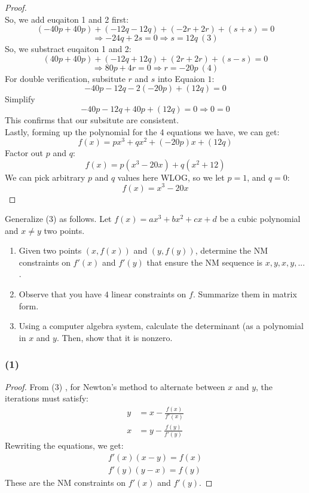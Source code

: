 \documentclass{article}
\begin{document}
\begin{proof}
    \\
    So, we add euqaiton 1 and 2 first:
    \[ (-40p + 40p) + (-12q - 12q) + (-2r + 2r) + (s + s) = 0 \]
    \[ \Rightarrow -24q + 2s = 0 \Longrightarrow s = 12q \ (3) \]
    So, we substract euqaiton 1 and 2:\
    \[ (40p + 40p) + (-12q + 12q) + (2r + 2r) + (s - s) = 0 \]
    \[ \Rightarrow 80p + 4r = 0 \Longrightarrow r = -20p \ (4) \]
    For double verification, subsitute $r$ and $s$ into Equaion $1$:
    \[ -40p - 12q - 2(-20p) + (12q) = 0 \]
    Simplify
    \[ -40p - 12q + 40p + (12q) = 0 \Longrightarrow 0 = 0 \]
    This confirms that our subsitute are consistent.
    \\
    Lastly, forming up the polynomial for the 4 equations we have, we can get:
    \[ f(x) = px^3 + qx^2 + (-20p)x + (12q) \]
    Factor out $p$ and $q$:
    \[ f(x) = p(x^3 - 20x) + q(x^2 + 12) \]
    We can pick arbitrary $p$ and $q$ values here WLOG, so we let $p = 1$, and $q = 0$:
    \[ f(x) = x^3 - 20x \]
\end{proof}

\begin{problem}
    Generalize (3) as follows. Let \(f(x) = ax^3 + bx^2 + cx +d\) be a cubic polynomial and \(x\neq y\) two points.
    \begin{enumerate}
        \item Given two points \((x,f(x))\) and \((y,f(y))\), determine the NM constraints on \(f'(x)\) and \(f'(y)\) that ensure the NM sequence is \(x,y,x,y,...\).
        \item Observe that you have \(4\) linear constraints on \(f\). Summarize them in matrix form.
        \item Using a computer algebra system, calculate the determinant (as a polynomial in \(x\) and \(y\). Then, show that it is nonzero.
    \end{enumerate}
\end{problem}

\subsubsection*{(1)}
\begin{proof}
    From (3) , for Newton's method to alternate between $x$ and $y$, the iterations must satisfy:
    \[
        \begin{aligned}
            y &= x - \frac{f(x)}{f'(x)} \\
            x &= y - \frac{f(y)}{f'(y)}
        \end{aligned}
    \]
    Rewriting the equations, we get:
    \[
        \begin{aligned}
            f'(x)(x - y) = f(x) \\
            f'(y)(y - x) = f(y)
        \end{aligned}
    \]
    These are the NM constraints on $f'(x)$ and $f'(y)$.
\end{proof}
\end{document}

